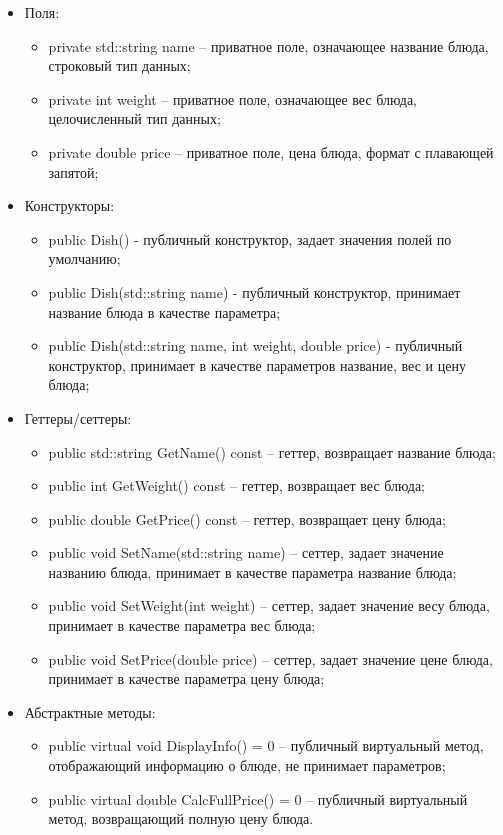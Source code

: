 \documentclass[a4paper,14pt]{extarticle}
\begin{document}
\begin{itemize}
  \item[--] Поля:
  \begin{itemize}
    \item[--] private std::string name -- приватное поле, означающее название блюда, строковый тип данных;
    \item[--] private int weight -- приватное поле, означающее вес блюда, целочисленный тип данных;
    \item[--] private double price -- приватное поле, цена блюда, формат с плавающей запятой;
  \end{itemize}
  \item[--] Конструкторы:
  \begin{itemize}
    \item[--] public Dish() - публичный конструктор, задает значения полей по умолчанию;
    \item[--] public Dish(std::string name) - публичный конструктор, принимает название блюда в качестве параметра;
    \item[--] public Dish(std::string name, int weight, double price) - публичный конструктор, принимает  в качестве параметров название, вес и цену блюда;
  \end{itemize}
  \item[--] Геттеры/сеттеры:
  \begin{itemize}
    \item[--] public std::string GetName() const -- геттер, возвращает название блюда;
    \item[--] public int GetWeight() const -- геттер, возвращает вес блюда;
    \item[--] public double GetPrice() const -- геттер, возвращает цену блюда;
    \item[--] public void SetName(std::string name) -- сеттер, задает значение названию блюда, принимает в качестве параметра название блюда;
    \item[--] public void SetWeight(int weight) -- сеттер, задает значение весу блюда, принимает в качестве параметра вес блюда;
    \item[--] public void SetPrice(double price) -- сеттер, задает значение цене блюда, принимает в качестве параметра цену блюда;
  \end{itemize}
  \item[--] Абстрактные методы:
  \begin{itemize}
    \item[--] public virtual void DisplayInfo() = 0 -- публичный виртуальный метод, отображающий информацию о блюде, не принимает параметров;
    \item[--] public virtual double CalcFullPrice() = 0 -- публичный виртуальный метод, возвращающий полную цену блюда.
  \end{itemize}
\end{itemize}
\end{document}
